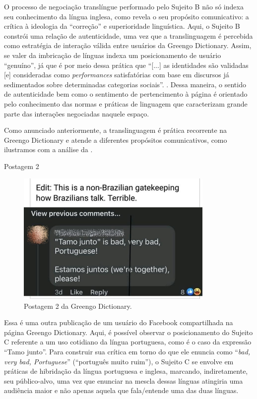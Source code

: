 \documentclass[portuguese]{textolivre}
\begin{document}
O processo de negociação translíngue performado pelo Sujeito B não só indexa seu conhecimento da língua inglesa, como revela o seu propósito comunicativo: a crítica à ideologia da “correção” e superioridade linguística. Aqui, o Sujeito B constrói uma relação de autenticidade, uma vez que a translinguagem é percebida como estratégia de interação válida entre usuários da Greengo Dictionary. Assim, se valer da imbricação de línguas indexa um posicionamento de usuário “genuíno”, já que é por meio dessa prática que “[...] as identidades são validadas [e] consideradas como \textit{performances} satisfatórias com base em discursos já sedimentados sobre determinadas categorias sociais”. \cite[p. 451]{borba_discurso_2009}. Dessa maneira, o sentido de autenticidade bem como o sentimento de pertencimento à página é orientado pelo conhecimento das normas e práticas de linguagem que caracterizam grande parte das interações negociadas naquele espaço.

Como anunciado anteriormente, a translinguagem é prática recorrente na Greengo Dictionary e atende a diferentes propósitos comunicativos, como ilustramos com a análise da .

Postagem 2

\begin{figure}[htbp]
 \centering
 \includegraphics[width=0.85\textwidth]{Fig3.png}
 \caption{Postagem 2 da Greengo Dictionary.}
 \label{fig3}
\end{figure}

Essa é uma outra publicação de um usuário do Facebook compartilhada na página Greengo Dictionary. Aqui, é possível observar o posicionamento do Sujeito C referente a um uso cotidiano da língua portuguesa, como é o caso da expressão “Tamo junto”. Para construir sua crítica em torno do que ele enuncia como “\textit{bad, very bad, Portuguese}” (“português muito ruim”), o Sujeito C se envolve em práticas de hibridação da língua portuguesa e inglesa, marcando, indiretamente, seu público-alvo, uma vez que enunciar na mescla dessas línguas atingiria uma audiência maior e não apenas aquela que fala/entende uma das duas línguas.
\end{document}

